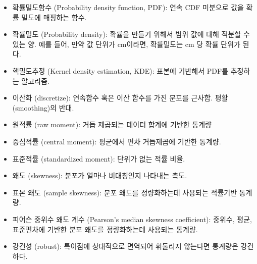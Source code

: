 \begin{itemize}

\item 확률밀도함수 (Probability density function, PDF): 
연속 CDF 미분으로 값을 확률 밀도에 매핑하는 함수.

\item 확률밀도 (Probability density): 
  확률을 만들기 위해서 범위 값에 대해 적분할 수 있는 양.
  예를 들어, 만약 값 단위가 cm이라면, 확률밀도는 cm 당 확률 단위가 된다. 

\item 핵밀도추정 (Kernel density estimation, KDE): 
  표본에 기반해서 PDF를 추정하는 알고리즘.

\item 이산화 (discretize): 
  연속함수 혹은 이산 함수를 가진 분포를 근사함. 평활(smoothing)의 반대.

\item 원적률 (raw moment): 
  거듭 제곱되는 데이터 합계에 기반한 통계량

\item 중심적률 (central moment): 
  평균에서 편차 거듭제곱에 기반한 통계량.

\item 표준적률 (standardized moment): 
  단위가 없는 적률 비율.

\item 왜도 (skewness): 
  분포가 얼마나 비대칭인지 나타내는 측도.

\item 표본 왜도 (sample skewness): 
  분포 왜도를 정량화하는데 사용되는 적률기반 통계량.

\item 피어슨 중위수 왜도 계수 (Pearson's median skewness coefficient): 
  중위수, 평균, 표준편차에 기반한 분포 왜도를 정량화하는데 사용되는 통계량.

\item 강건성 (robust): 
  특이점에 상대적으로 면역되어 휘둘리지 않는다면 통계량은 강건하다.

\end{itemize}

